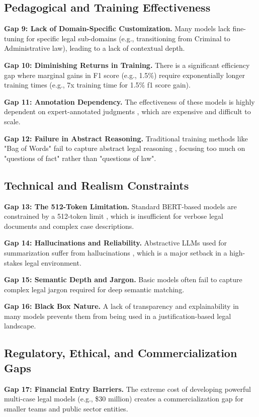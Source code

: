 \subsection{Pedagogical and Training Effectiveness}
\textbf{Gap 9: Lack of Domain-Specific Customization.} Many models lack fine-tuning for specific legal sub-domains \cite{b17} \cite{b21} (e.g., transitioning from Criminal to Administrative law), leading to a lack of contextual depth.

\textbf{Gap 10: Diminishing Returns in Training.} There is a significant efficiency gap where marginal gains in F1 score (e.g., 1.5\%) require exponentially longer training times \cite{b9} \cite{b21} (e.g., 7x training time for 1.5\% f1 score gain).

\textbf{Gap 11: Annotation Dependency.} The effectiveness of these models is highly dependent on expert-annotated judgments \cite{b19} \cite{b24} \cite{b25}, which are expensive and difficult to scale.


\textbf{Gap 12: Failure in Abstract Reasoning.} Traditional training methods like "Bag of Words" fail to capture abstract legal reasoning \cite{b6} \cite{b18} \cite{b23}, focusing too much on "questions of fact" rather than "questions of law".


\subsection{Technical and Realism Constraints}
\textbf{Gap 13: The 512-Token Limitation.} Standard BERT-based models are constrained by a 512-token limit \cite{b4} \cite{b8} \cite{b9} \cite{b21} \cite{b24}, which is insufficient for verbose legal documents and complex case descriptions.

\textbf{Gap 14:	Hallucinations and Reliability.} Abstractive LLMs used for summarization suffer from hallucinations\cite{b17} \cite{b25}, which is a major setback in a high-stakes legal environment.

\textbf{Gap 15: Semantic Depth and Jargon.} Basic models often fail to capture complex legal jargon \cite{b10} \cite{b11} \cite{b17} required for deep semantic matching.

\textbf{Gap 16: Black Box Nature.} A lack of transparency and explainability \cite{b1} \cite{b3} in many models prevents them from being used in a justification-based legal landscape.


\subsection{Regulatory, Ethical, and Commercialization Gaps}
\textbf{Gap 17: Financial Entry Barriers.} The extreme cost of developing powerful multi-case legal models (e.g., \$30 million) \cite{b15} creates a commercialization gap for smaller teams and public sector entities.

